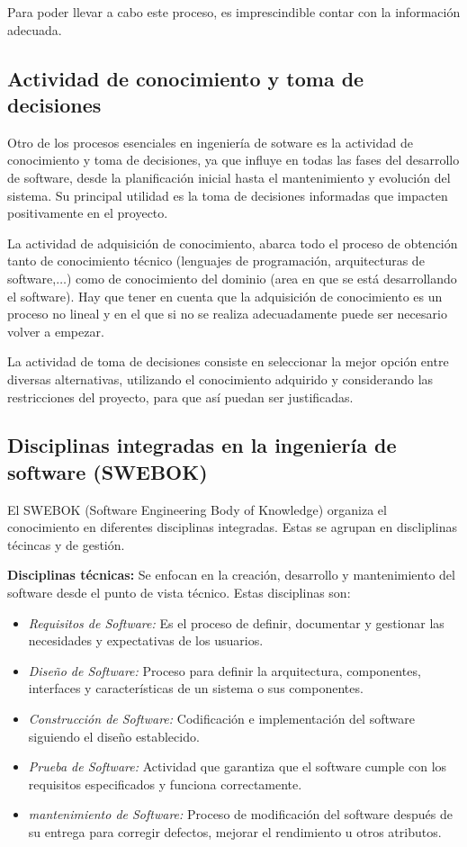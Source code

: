 Para poder llevar a cabo este proceso, es imprescindible contar con la información adecuada.

\subsection{Actividad de conocimiento y toma de decisiones}

Otro de los procesos esenciales en ingeniería de sotware es la actividad de conocimiento y toma de decisiones, ya que influye en todas las fases del desarrollo de software,
 desde la planificación inicial hasta el mantenimiento y evolución del sistema. Su principal utilidad es la toma de decisiones informadas que impacten positivamente en el proyecto.

La actividad de adquisición de conocimiento, abarca todo el proceso de obtención tanto de conocimiento técnico (lenguajes de programación, arquitecturas de software,$\dots$) como de conocimiento del dominio (area en que se está desarrollando el software). Hay que tener en cuenta que la adquisición de conocimiento es un proceso no lineal y en el que si no se realiza adecuadamente puede ser necesario volver a empezar.

La actividad de toma de decisiones consiste en seleccionar la mejor opción entre diversas alternativas, utilizando el conocimiento adquirido y considerando las restricciones del proyecto, para que así puedan ser justificadas.

\subsection{Disciplinas integradas en la ingeniería de software (SWEBOK)}

El SWEBOK (Software Engineering Body of Knowledge) organiza el conocimiento en diferentes disciplinas integradas. Estas se agrupan en discliplinas técincas y de gestión.

\textbf{Disciplinas técnicas: } Se enfocan en la creación, desarrollo y mantenimiento del software desde el punto de vista técnico. Estas disciplinas son:  
\begin{itemize}
    \item \textit{Requisitos de Software: }Es el proceso de definir, documentar y gestionar las necesidades y expectativas de los usuarios.
    \item \textit{Diseño de Software: }Proceso para definir la arquitectura, componentes, interfaces y características de un sistema o sus componentes.
    \item \textit{Construcción de Software: }Codificación e implementación del software siguiendo el diseño establecido.
    \item \textit{Prueba de Software: }Actividad que garantiza que el software cumple con los requisitos especificados y funciona correctamente.
    \item \textit{mantenimiento de Software: }Proceso de modificación del software después de su entrega para corregir defectos, mejorar el rendimiento u otros atributos.
\end{itemize}

